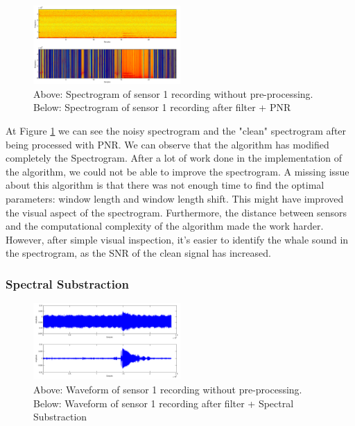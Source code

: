   \begin{figure}[htb]
	  \begin{center}
		  \includegraphics[width=0.5\textwidth]{figures/2PNR_spec.png}
	  \end{center}
	  \caption{Above: Spectrogram of sensor 1 recording without pre-processing. Below: Spectrogram of sensor 1 recording after filter + PNR}
	  \label{fig:result_PNR_spec}
  \end{figure}

  At Figure \ref{fig:result_PNR_spec} we can see the noisy spectrogram and the "clean" spectrogram after being processed with PNR. We can observe that the algorithm has modified completely the Spectrogram. After a lot of work done in the implementation of the algorithm, we could not be able to improve the spectrogram. A missing issue about this algorithm is that there was not enough time to find the optimal parameters: window length and window length shift. This might have improved the visual aspect of the spectrogram. Furthermore, the distance between sensors and the computational complexity of the algorithm made the work harder. However, after simple visual inspection, it's easier to identify the whale sound in the spectrogram, as the SNR of the clean signal has increased.
  

\subsubsection{Spectral Substraction}
  
  \begin{figure}[htb]
	  \begin{center}
		  \includegraphics[width=0.5\textwidth]{figures/3SpectralSub_waveform.png}
	  \end{center}
	  \caption{Above: Waveform of sensor 1 recording without pre-processing.  Below: Waveform of sensor 1 recording after filter + Spectral Substraction}
	  \label{fig:result_SS_waveform}
  \end{figure}
  
